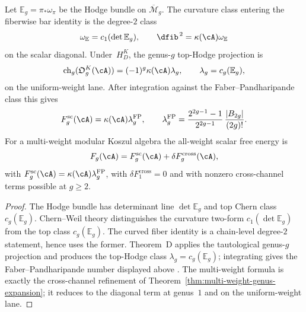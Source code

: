 \begin{proposition}
\label{prop:hodge-curvature-scalar-projection}
Let $\mathbb{E}_g=\pi_*\omega_\pi$ be the Hodge bundle on
$\overline{\mathcal{M}}_g$. The curvature class entering the
fiberwise bar identity is the degree-$2$ class
\[
  \omega_{\mathbb{E}}=c_1(\det\mathbb{E}_g),
  \qquad
  \dfib^{\,2}=\kappa(\cA)\omega_{\mathbb{E}}
\]
on the scalar diagonal.  Under~$H_D^K$, the genus-$g$ top-Hodge
projection is
\[
  \operatorname{ch}_g(\mathfrak O_g^K(\cA))
  =(-1)^g\kappa(\cA)\lambda_g,
  \qquad
  \lambda_g=c_g(\mathbb{E}_g),
\]
on the uniform-weight lane. After integration against the
Faber--Pandharipande class this gives
\[
  F_g^{\mathrm{sc}}(\cA)
  =
  \kappa(\cA)\lambda_g^{\mathrm{FP}},
  \qquad
  \lambda_g^{\mathrm{FP}}
  =
  \frac{2^{2g-1}-1}{2^{2g-1}}\,
  \frac{|B_{2g}|}{(2g)!}.
\]
For a multi-weight modular Koszul algebra the all-weight scalar
free energy is
\[
  F_g(\cA)
  =
  F_g^{\mathrm{sc}}(\cA)
  +
  \delta F_g^{\mathrm{cross}}(\cA),
\]
with \(F_g^{\mathrm{sc}}(\cA)=
\kappa(\cA)\lambda_g^{\mathrm{FP}}\),
with $\delta F_1^{\mathrm{cross}}=0$ and with nonzero
cross-channel terms possible at $g\geq2$.
\end{proposition}

\begin{proof}
The Hodge bundle has determinant line $\det\mathbb{E}_g$ and top
Chern class $c_g(\mathbb{E}_g)$. Chern--Weil theory distinguishes
the curvature two-form $c_1(\det\mathbb{E}_g)$ from the top class
$c_g(\mathbb{E}_g)$. The curved fiber identity is a chain-level
degree-$2$ statement, hence uses the former. Theorem~D applies the
tautological genus-$g$ projection and produces the top-Hodge class
$\lambda_g=c_g(\mathbb{E}_g)$; integrating gives the
Faber--Pandharipande number displayed above
\cite{FP03}. The multi-weight formula is exactly the
cross-channel refinement of
Theorem~\ref{thm:multi-weight-genus-expansion}; it reduces to the
diagonal term at genus~$1$ and on the uniform-weight lane.
\end{proof}

